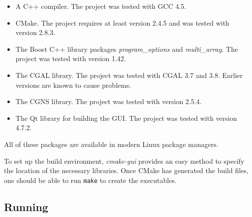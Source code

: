 \documentclass[a4paper,10pt]{article}
\begin{document}
\begin{itemize}
 \item A C++ compiler. The project was tested with GCC 4.5.
 \item CMake. The project requires at least version 2.4.5 and was tested with
version 2.8.3.
 \item The Boost C++ library packages \textit{program\_options} and
\textit{multi\_array}. The project was tested with version 1.42.
 \item The CGAL library. The project was tested with CGAL 3.7 and 3.8. Earlier
versions are known to cause problems.
 \item The CGNS library. The project was tested with version 2.5.4.
 \item The Qt library for building the GUI. The project was tested with
version 4.7.2.
\end{itemize}

All of these packages are available in modern Linux package managers.

To set up the build environment, \textit{cmake-gui} provides an easy method to
specify the location of the necessary libraries. Once CMake has generated the
build files, one should be able to run \texttt{make} to create the executables.

\subsection{Running}
\end{document}
